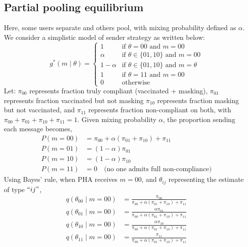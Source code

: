 \documentclass[sigconf,review]{acmart}
\begin{document}
\subsection{Partial pooling equilibrium}
\label{supp:equilibrium-pooling}
Here, some users separate and others pool, with mixing probability defined as $\alpha$. We consider a simplistic model of sender strategy as written below:
\begin{equation}
    g^*(m\mid \theta) =
\begin{cases}
1 & \text{if } \theta = 00 \text{ and } m = 00 \\
\alpha & \text{if } \theta \in \{01,10\} \text{ and } m = 00 \\
1-\alpha & \text{if } \theta \in \{01,10\} \text{ and } m = \theta \\
1 & \text{if } \theta = 11 \text{ and } m = 00 \\
0 & \text{otherwise}
\end{cases}
\end{equation}
Let:
$\pi_{00}$ represents fraction truly compliant (vaccinated + masking),
 $\pi_{01}$ represents fraction vaccinated but not masking
$\pi_{10}$  represents fraction masking but not vaccinated, and 
 $\pi_{11}$  represents  fraction non-compliant on both, with
$
\pi_{00} + \pi_{01} + \pi_{10} + \pi_{11} = 1.
$ Given mixing probability $\alpha$, the proportion sending each message becomes,
\begin{equation}
\begin{aligned}
P(m = 00) &= \pi_{00} + \alpha(\pi_{01} + \pi_{10}) + \pi_{11}\\
P(m = 01) &= (1 - \alpha)\pi_{01}\\
P(m = 10) &= (1 - \alpha)\pi_{10}\\
P(m = 11) &= 0 \quad \text{(no one admits full non-compliance)}    
\end{aligned}
\end{equation}
Using Bayes' rule, when PHA receives $m = 00$, and $\theta_{ij}$ representing the estimate of type $``ij"$,
\begin{equation}\begin{aligned}
q(\theta_{00} \mid m = 00) &= \frac{\pi_{00}}{\pi_{00} + \alpha(\pi_{01} + \pi_{10}) + \pi_{11}}\\
q(\theta_{01} \mid m = 00) &= \frac{\alpha \pi_{01}}{\pi_{00} + \alpha(\pi_{01} + \pi_{10}) + \pi_{11}}\\
q(\theta_{10} \mid m = 00) &= \frac{\alpha \pi_{10}}{\pi_{00} + \alpha(\pi_{01} + \pi_{10}) + \pi_{11}}\\
q(\theta_{11} \mid m = 00) &= \frac{\pi_{11}}{\pi_{00} + \alpha(\pi_{01} + \pi_{10}) + \pi_{11}}\end{aligned}
\end{equation}
\end{document}
